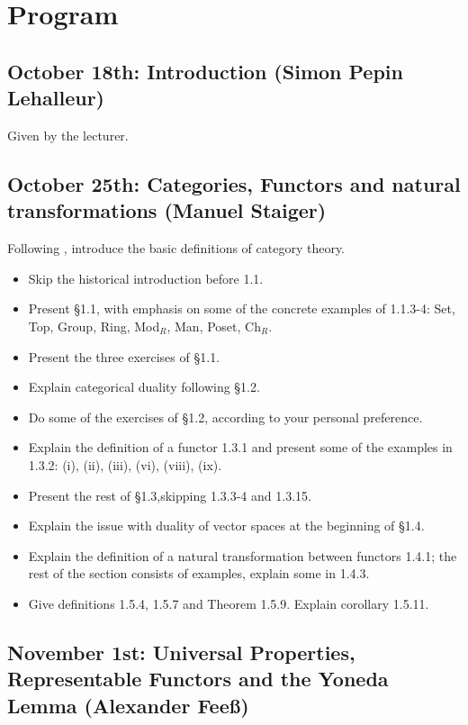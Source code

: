 \documentclass{amsart}
\theoremstyle{definition}
\theoremstyle{remark}
\begin{document}
\section*{Program}

\subsection{October 18th: Introduction (Simon Pepin Lehalleur)}

Given by the lecturer.

\subsection{October 25th: Categories, Functors and natural transformations (Manuel Staiger)}

Following \cite[Chapter 1]{Riehl_context}, introduce the basic definitions of category theory.

\begin{itemize}
\item Skip the historical introduction before 1.1.
\item Present \S 1.1, with emphasis on some of the concrete examples of 1.1.3-4: Set, Top, Group, Ring, Mod$_R$, Man, Poset, Ch$_R$.
\item Present the three exercises of \S 1.1.
\item Explain categorical duality following \S 1.2.
\item Do some of the exercises of \S 1.2, according to your personal preference.
\item Explain the definition of a functor 1.3.1 and present some of the examples in 1.3.2: (i), (ii), (iii), (vi), (viii), (ix).
\item Present the rest of \S 1.3,skipping 1.3.3-4 and 1.3.15.
\item Explain the issue with duality of vector spaces at the beginning of \S 1.4.
\item Explain the definition of a natural transformation between functors 1.4.1; the rest of the section consists of examples, explain some in 1.4.3.
\item Give definitions 1.5.4, 1.5.7 and Theorem 1.5.9. Explain corollary 1.5.11.
\end{itemize}

\subsection{November 1st: Universal Properties, Representable Functors and the Yoneda Lemma (Alexander Fee{\ss})}
\end{document}
